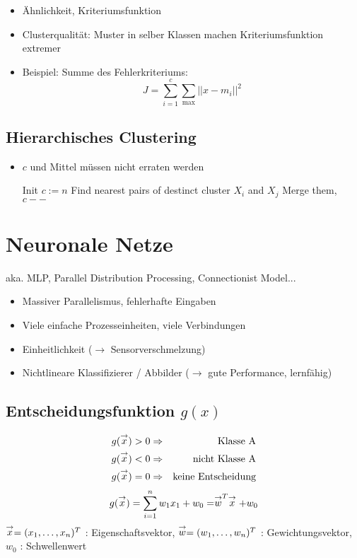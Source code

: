 \begin{itemize}
\item Ähnlichkeit, Kriteriumsfunktion
\item Clusterqualität: Muster in selber Klassen machen Kriteriumsfunktion extremer
\item Beispiel: Summe des Fehlerkriteriums: $$J = \sum\limits_{i=1}^c \sum\limits_{\max} || x - m_i ||^2$$
\end{itemize}

\subsection{Hierarchisches Clustering}

\begin{itemize}
\item $c$ und Mittel müssen nicht erraten werden
\begin{algorithmic}
	\State Init $c := n$
		\State Find nearest pairs of destinct cluster $X_i$ and $X_j$
		\State Merge them, $c--$
	\EndWhile
\end{algorithmic}
\end{itemize}


\section{Neuronale Netze}

aka. MLP, Parallel Distribution Processing, Connectionist Model...

\begin{itemize}
\item Massiver Parallelismus, fehlerhafte Eingaben
\item Viele einfache Prozesseinheiten, viele Verbindungen
\item Einheitlichkeit ($\to$ Sensorverschmelzung)
\item Nichtlineare Klassifizierer / Abbilder ($\to$ gute Performance, lernfähig)
\end{itemize}

\subsection{Entscheidungsfunktion $g(x)$}

\begin{eqnarray*}
g(\stackrel{\to}{x}) > 0 &\Rightarrow& \textrm{Klasse A} \\ g(\stackrel{\to}{x}) < 0 &\Rightarrow& \textrm{nicht Klasse A} \\ g(\stackrel{\to}{x}) = 0 &\Rightarrow& \textrm{keine Entscheidung}
\end{eqnarray*}
$$g(\stackrel{\to}{x}) = \sum\limits_{i=1}^n w_1x_1 + w_0 = \stackrel{\to}{w}^T \stackrel{\to}{x} + w_0$$
$\stackrel{\to}{x} = (x_1,\dots,x_n)^T$ : Eigenschaftsvektor, $\stackrel{\to}{w} = (w_1,\dots,w_n)^T$ : Gewichtungsvektor, $w_0$ : Schwellenwert

